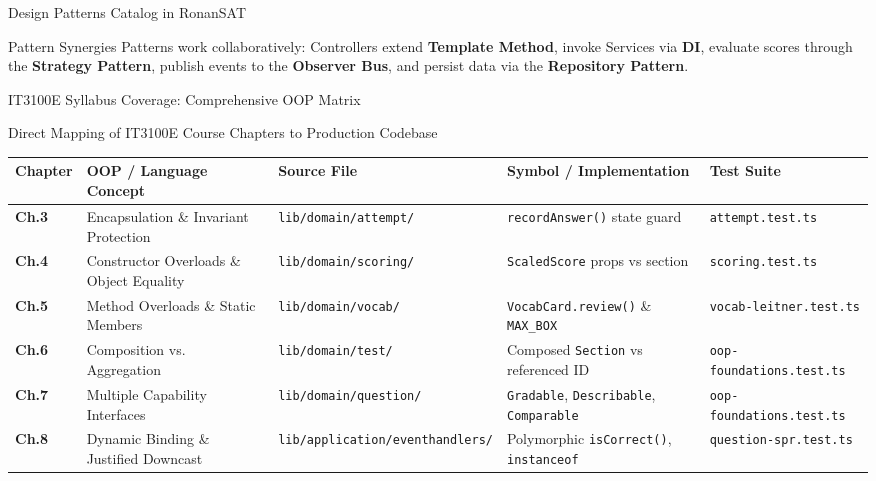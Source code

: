 ﻿\documentclass[aspectratio=169,10pt,t]{beamer}
\begin{document}
\begin{frame}{Design Patterns Catalog in RonanSAT}
  \vspace{0.4mm}
  \begin{hlCard}{Pattern Synergies}
    \fontsize{5.6pt}{6.6pt}\selectfont
    Patterns work collaboratively: Controllers extend \textbf{Template Method}, invoke Services via \textbf{DI}, evaluate scores through the \textbf{Strategy Pattern}, publish events to the \textbf{Observer Bus}, and persist data via the \textbf{Repository Pattern}.
  \end{hlCard}
\end{frame}

\begin{frame}{IT3100E Syllabus Coverage: Comprehensive OOP Matrix}
  \vspace{0.2mm}
  \begin{infoCard}{Direct Mapping of IT3100E Course Chapters to Production Codebase}
    \setlength{\tabcolsep}{1.2pt}
    \fontsize{4.6pt}{5.6pt}\selectfont
    \renewcommand{\arraystretch}{0.95}
    \begin{tabular}{@{}p{10mm}p{34mm}p{28mm}p{34mm}p{23mm}@{}}
      \toprule
      \textbf{Chapter} & \textbf{OOP / Language Concept} & \textbf{Source File} & \textbf{Symbol / Implementation} & \textbf{Test Suite} \\
      \midrule
      \textbf{Ch.3} & Encapsulation \& Invariant Protection & \texttt{lib/domain/attempt/} & \texttt{recordAnswer()} state guard & \texttt{attempt.test.ts} \\
      \textbf{Ch.4} & Constructor Overloads \& Object Equality & \texttt{lib/domain/scoring/} & \texttt{ScaledScore} props vs section & \texttt{scoring.test.ts} \\
      \textbf{Ch.5} & Method Overloads \& Static Members & \texttt{lib/domain/vocab/} & \texttt{VocabCard.review()} \& \texttt{MAX\_BOX} & \texttt{vocab-leitner.test.ts} \\
      \textbf{Ch.6} & Composition vs. Aggregation & \texttt{lib/domain/test/} & Composed \texttt{Section} vs referenced ID & \texttt{oop-foundations.test.ts} \\
      \textbf{Ch.7} & Multiple Capability Interfaces & \texttt{lib/domain/question/} & \texttt{Gradable}, \texttt{Describable}, \texttt{Comparable} & \texttt{oop-foundations.test.ts} \\
      \textbf{Ch.8} & Dynamic Binding \& Justified Downcast & \texttt{lib/application/eventhandlers/} & Polymorphic \texttt{isCorrect()}, \texttt{instanceof} & \texttt{question-spr.test.ts} \\

\end{tabular}
\end{infoCard}
\end{frame}
\end{document}
